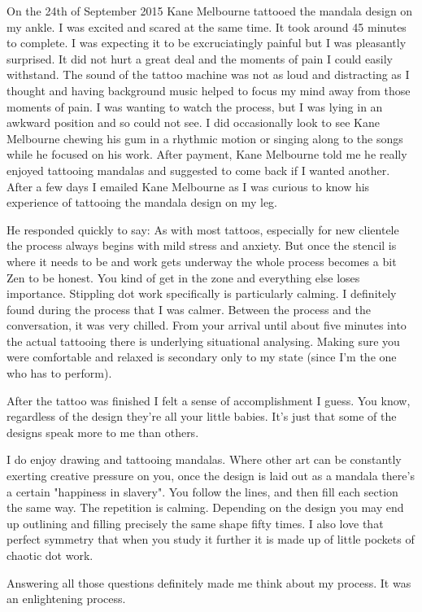 On the 24th of September 2015 Kane Melbourne tattooed the mandala design on my ankle. I was excited and scared at the same time. It took around 45 minutes to complete. I was expecting it to be excruciatingly painful but I was pleasantly surprised. It did not hurt a great deal and the moments of pain I could easily withstand. The sound of the tattoo machine was not as loud and distracting as I thought and having background music helped to focus my mind away from those moments of pain. I was wanting to watch the process, but I was lying in an awkward position and so could not see. I did occasionally look to see Kane Melbourne chewing his gum in a rhythmic motion or singing along to the songs while he focused on his work. After payment, Kane Melbourne told me he really enjoyed tattooing mandalas and suggested to come back if I wanted another. After a few days I emailed Kane Melbourne as I was curious to know his experience of tattooing the mandala design on my leg. 

He responded quickly to say:  
As with most tattoos, especially for new clientele the process always begins with mild stress and anxiety. But once the stencil is where it needs to be and work gets underway the whole process becomes a bit Zen to be honest. You kind of get in the zone and everything else loses importance. Stippling dot work specifically is particularly calming.
I definitely found during the process that I was calmer. Between the process and the conversation, it was very chilled. From your arrival until about five minutes into the actual tattooing there is underlying situational analysing. Making sure you were comfortable and relaxed is secondary only to my state (since I'm the one who has to perform).

After the tattoo was finished I felt a sense of accomplishment I guess. You know, regardless of the design they're all your little babies. It's just that some of the designs speak more to me than others.

I do enjoy drawing and tattooing mandalas. Where other art can be constantly exerting creative pressure on you, once the design is laid out as a mandala there's a certain "happiness in slavery". You follow the lines, and then fill each section the same way. The repetition is calming. Depending on the design you may end up outlining and filling precisely the same shape fifty times. I also love that perfect symmetry that when you study it further it is made up of little pockets of chaotic dot work.

Answering all those questions definitely made me think about my process. It was an enlightening process.

